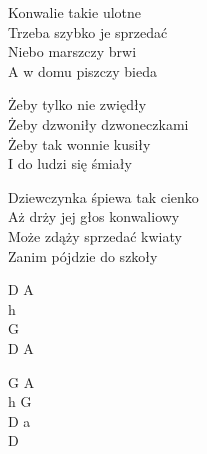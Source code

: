 \begin{text}
    Konwalie takie ulotne\\
    Trzeba szybko je sprzedać\\
    Niebo marszczy brwi\\
    A w domu piszczy bieda

    \vin Żeby tylko nie zwiędły\\
    \vin Żeby dzwoniły dzwoneczkami\\
    \vin Żeby tak wonnie kusiły\\
    \vin I do ludzi się śmiały

    Dziewczynka śpiewa tak cienko\\
    Aż drży jej głos konwaliowy\\
    Może zdąży sprzedać kwiaty\\
    Zanim pójdzie do szkoły
\end{text}
\begin{chord}
    D A\\
    h\\
    G\\
    D A

    G A\\
    h G\\
    D a\\
    D
\end{chord}